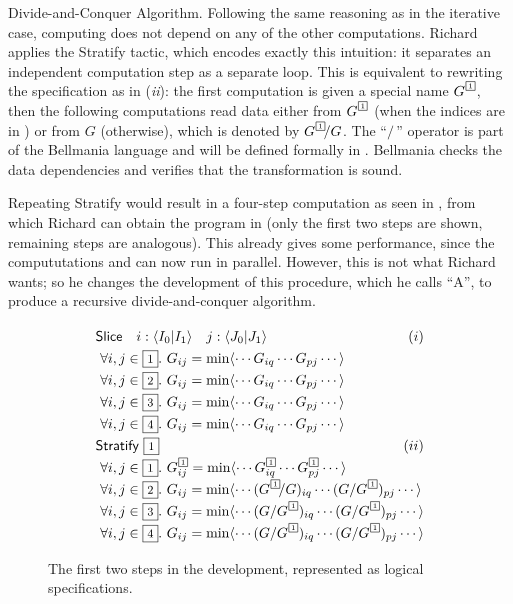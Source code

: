 \begin{paragraph}{Divide-and-Conquer Algorithm.}
Following the same reasoning as in the iterative case, computing 
does not depend on any of the other computations. Richard applies the
{\sf Stratify} tactic, which encodes exactly this intuition: it separates
an independent computation step as a separate loop.
This is equivalent to rewriting the specification as in ({\it ii}):
the first computation is given a special name $G^{\tinyqbox1}$, then the following
computations read data either from $G^{\tinyqbox1}$ (when the indices are in )
or from $G$ (otherwise), which is denoted by $G^{\tinyqbox1}\!/G$. The ``$/\,$'' operator
is part of the Bellmania language and will be defined formally in .
Bellmania checks the data dependencies and verifies that the transformation
is sound.

Repeating {\sf Stratify} would result in a four-step computation
as seen in , from which Richard can obtain the program in 
(only the first two steps are shown, remaining steps are analogous).
This already gives some performance, since the compututations  and 
can now run in parallel. However, this is not what Richard wants; so he
changes the development of this procedure, which he calls ``A'', to produce
a recursive divide-and-conquer algorithm.
\end{paragraph}


\begin{figure}
\[\renewcommand\arraystretch{1.3}
  \begin{array}{@{}l@{}}
    \textsf{Slice} \quad i:\langle I_0|I_1\rangle \quad j:\langle J_0|J_1\rangle \hfill (i)\\
    ~\forall i,j\in\qbox1.~ G_{ij} = \min \langle\cdots G_{iq} \cdots G_{pj} \cdots \rangle \\
    ~\forall i,j\in\qbox2.~ G_{ij} = \min \langle\cdots G_{iq} \cdots G_{pj} \cdots \rangle \\
    ~\forall i,j\in\qbox3.~ G_{ij} = \min \langle\cdots G_{iq} \cdots G_{pj} \cdots \rangle \\
    ~\forall i,j\in\qbox4.~ G_{ij} = \min \langle\cdots G_{iq} \cdots G_{pj} \cdots \rangle \\
    \textsf{Stratify} ~ \qbox1 \hfill (ii)\\
    ~\forall i,j\in\qbox1.~ G^{\tinyqbox1}_{ij} = \min \langle\cdots G^{\tinyqbox1}_{iq} \cdots G^{\tinyqbox1}_{pj} \cdots \rangle \\
    ~\forall i,j\in\qbox2.~ G_{ij} = \min \langle\cdots (G^{\tinyqbox1}\!/G)_{iq} \cdots (G/G^{\tinyqbox1})_{pj} \cdots \rangle \\
    ~\forall i,j\in\qbox3.~ G_{ij} = \min \langle\cdots (G/G^{\tinyqbox1})_{iq} \cdots (G/G^{\tinyqbox1})_{pj} \cdots \rangle \\
    ~\forall i,j\in\qbox4.~ G_{ij} = \min \langle\cdots (G/G^{\tinyqbox1})_{iq} \cdots (G/G^{\tinyqbox1})_{pj} \cdots \rangle
  \end{array}
\]
\caption{\label{overview:logical-slice-stratify}
  The first two steps in the development, represented as logical specifications.}
\end{figure}


